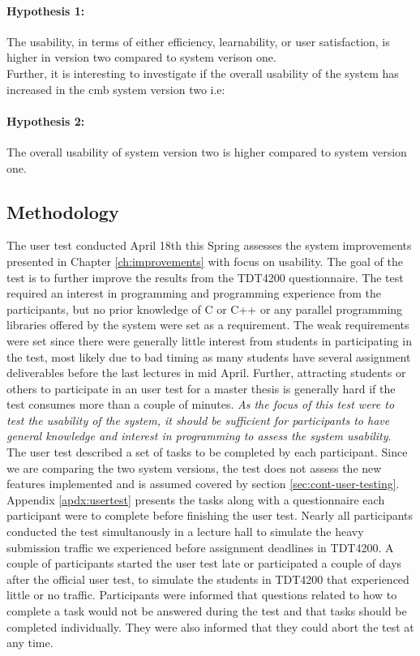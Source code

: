 \paragraph*{Hypothesis 1:} The usability, in terms of either efficiency, learnability, or user satisfaction, is higher in version two compared to system verison one. \hfill \\

Further, it is interesting to investigate if the overall usability of the system has increased in the \gls{cmb} system version two i.e:

\paragraph*{Hypothesis 2:} The overall usability of system version two is higher compared to system version one. \hfill \\

\subsection{Methodology}
The user test conducted April 18th this Spring assesses the system improvements presented in Chapter \ref{ch:improvements} with focus on usability. The goal of the test is to further improve the results from the TDT4200 questionnaire. The test required an interest in programming and programming experience from the participants, but no prior knowledge of C or C++ or any parallel programming libraries offered by the system were set as a requirement. The weak requirements were set since there were generally little interest from students in participating in the test, most likely due to bad timing as many students have several assignment deliverables before the last lectures in mid April. Further, attracting students or others to participate in an user test for a master thesis is generally hard if the test consumes more than a couple of minutes. \textit{As the focus of this test were to test the usability of the system, it should be sufficient for participants to have general knowledge and interest in programming to assess the system usability}. \\

The user test described a set of tasks to be completed by each participant. Since we are comparing the two system versions, the test does not assess the new features implemented and is assumed covered by section \ref{sec:cont-user-testing}. Appendix \ref{apdx:usertest} presents the tasks along with a questionnaire each participant were to complete before finishing the user test. Nearly all participants conducted the test simultanously in a lecture hall to simulate the heavy submission traffic we experienced before assignment deadlines in TDT4200. A couple of participants started the user test late or participated a couple of days after the official user test, to simulate the students in TDT4200 that experienced little or no traffic. Participants were informed that questions related to how to complete a task would not be answered during the test and that tasks should be completed individually. They were also informed that they could abort the test at any time. \\


